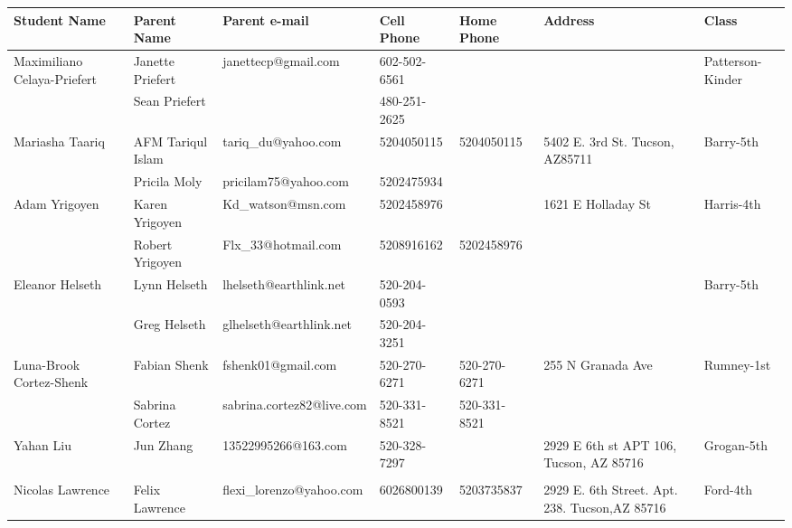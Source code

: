 \documentclass[landscape]{book}\usepackage[]{graphicx}\usepackage[]{color}
\begin{document}


\begin{longtable}{p{70pt}|p{75pt}|p{120pt}|p{60pt}|p{60pt}|p{100pt}|p{70pt}|}
Student Name & Parent Name & Parent e-mail & Cell Phone & Home Phone & Address & Class\\
\hline

\multirow{2}{70pt}{Maximiliano Celaya-Priefert} & Janette Priefert & janettecp@gmail.com & 602-502-6561 &  & \multirow{2}{100pt}{} & \multirow{2}{70pt}{Patterson-Kinder}\\
 & Sean Priefert &  & 480-251-2625 &  & & \\
\hline
\multirow{2}{70pt}{Mariasha Taariq} & AFM Tariqul Islam & tariq\_du@yahoo.com & 5204050115 & 5204050115 & \multirow{2}{100pt}{5402 E. 3rd St. Tucson, AZ85711} & \multirow{2}{70pt}{Barry-5th}\\
 & Pricila Moly & pricilam75@yahoo.com & 5202475934 &  & & \\
\hline
\multirow{2}{70pt}{Adam Yrigoyen} & Karen Yrigoyen  & Kd\_watson@msn.com & 5202458976 &  & \multirow{2}{100pt}{1621 E Holladay St} & \multirow{2}{70pt}{Harris-4th}\\
 & Robert Yrigoyen & Flx\_33@hotmail.com  & 5208916162 & 5202458976 & & \\
\hline
\multirow{2}{70pt}{Eleanor Helseth} & Lynn Helseth & lhelseth@earthlink.net & 520-204-0593 &  & \multirow{2}{100pt}{} & \multirow{2}{70pt}{Barry-5th}\\
 & Greg Helseth & glhelseth@earthlink.net & 520-204-3251 &  & & \\
\hline
\multirow{2}{70pt}{Luna-Brook Cortez-Shenk} & Fabian Shenk & fshenk01@gmail.com & 520-270-6271 & 520-270-6271 & \multirow{2}{100pt}{255 N Granada Ave} & \multirow{2}{70pt}{Rumney-1st}\\
 & Sabrina Cortez & sabrina.cortez82@live.com & 520-331-8521 & 520-331-8521 & & \\
\hline
\multirow{2}{70pt}{Yahan Liu} & Jun Zhang & 13522995266@163.com & 520-328-7297 &  & \multirow{2}{100pt}{2929 E 6th st APT 106, Tucson, AZ 85716} & \multirow{2}{70pt}{Grogan-5th}\\
 &  &  &  &  & & \\
\hline
\multirow{2}{70pt}{Nicolas Lawrence} & Felix Lawrence & flexi\_lorenzo@yahoo.com & 6026800139 & 5203735837 & \multirow{2}{100pt}{2929 E. 6th Street. Apt. 238. Tucson,AZ 85716} & \multirow{2}{70pt}{Ford-4th}\\

\end{longtable}
\end{document}
